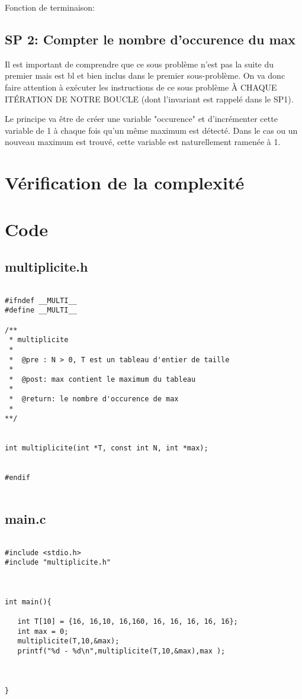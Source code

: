 \documentclass[a4paper, 11pt, oneside]{article}
\begin{document}
Fonction de terminaison:

\subsection{SP 2: Compter le nombre d'occurence du max}

Il est important de comprendre que ce sous problème n'est pas la suite du premier mais est bl et bien inclus dans le premier sous-problème. On va donc faire attention à exécuter les instructions de ce sous problème À CHAQUE ITÉRATION DE NOTRE BOUCLE (dont l'invariant est rappelé dans  le SP1).

Le principe va être de créer une variable "occurence" et d'incrémenter cette variable de 1 à chaque fois qu'un même maximum est détecté. Dans le cas ou un nouveau maximum est trouvé, cette variable est naturellement ramenée à 1.



\section{Vérification de la complexité}





\section{Code}
\subsection{multiplicite.h}
\begin{lstlisting}[caption={Header}]

#ifndef __MULTI__
#define __MULTI__

/**
 * multiplicite
 *
 *  @pre : N > 0, T est un tableau d'entier de taille
 *
 *  @post: max contient le maximum du tableau
 *
 *  @return: le nombre d'occurence de max
 *
**/


int multiplicite(int *T, const int N, int *max);


#endif


\end{lstlisting}

\subsection{main.c}
\begin{lstlisting}[caption={Main}]

#include <stdio.h>
#include "multiplicite.h"



int main(){

   int T[10] = {16, 16,10, 16,160, 16, 16, 16, 16, 16};
   int max = 0;
   multiplicite(T,10,&max);
   printf("%d - %d\n",multiplicite(T,10,&max),max );



}

\end{lstlisting}
\end{document}
